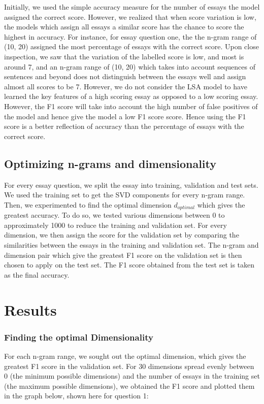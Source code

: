 \documentclass[10pt,letterpaper]{article}
\begin{document}
Initially, we used the simple accuracy measure for the number of essays the model assigned the correct score. However, we realized that when score variation is low, the models which assign all essays a similar score has the chance to score the highest in accuracy. For instance, for essay question one, the the n-gram range of (10, 20) assigned the most percentage of essays with the correct score. Upon close inspection, we saw that the variation of the labelled score is low, and most is around 7, and an n-gram range of (10, 20) which takes into account sequences of sentences and beyond does not distinguish between the essays well and assign almost all scores to be 7. However, we do not consider the LSA model to have learned the key features of a high scoring essay as opposed to a low scoring essay. However, the F1 score will take into account the high number of false positives of the model and hence give the model a low F1 score score. Hence using the F1 score is a better reflection of accuracy than the percentage of essays with the correct score. 

\subsection{Optimizing n-grams and dimensionality}

For every essay question, we split the essay into training, validation and test sets. We used the training set to get the SVD components for every n-gram range. Then, we experimented to find the optimal dimension $d_{optimal}$ which gives the greatest accuracy. To do so, we tested various dimensions between 0 to approximately 1000 to reduce the training and validation set. For every dimension, we then assign the score for the validation set by comparing the similarities between the essays in the training and validation set. The n-gram and dimension pair which give the greatest F1 score on the validation set is then chosen to apply on the test set. The F1 score obtained from the test set is taken as the final accuracy. 

\section{Results}

\subsubsection{Finding the optimal Dimensionality}

For each n-gram range, we sought out the optimal dimension, which gives the greatest F1 score in the validation set. For 30 dimensions spread evenly between 0 (the minimum possible dimensions) and the number of essays in the training set (the maximum possible dimensions), we obtained the F1 score and plotted them in the graph below, shown here for question 1: 
\end{document}
